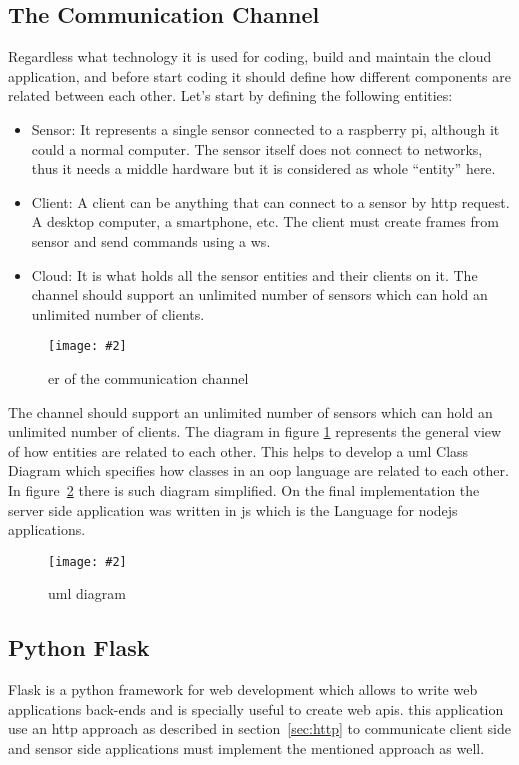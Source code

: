 \documentclass[hidelinks,11pt,a4paper,oneside,article]{memoir}
\newcommand{\putimage}[3][10] %
{
\begin{figure}[h]
	\centering
	\captionsetup{justification=centering}
	\texttt{[image: \#2]}
	\caption{#3}
	\label{fig:#2}
\end{figure}
}
\begin{document}
\subsection{The Communication Channel}\label{sec:the-communication-channel}
Regardless what technology it is used for coding, build and maintain the cloud application, and before start coding it should define how different components are related between each other.
Let’s start by defining the following entities:
\begin{itemize}
    \item Sensor: It represents a single sensor connected to a raspberry pi, although it could a normal computer. The sensor itself does not connect to networks, thus it needs a middle hardware but it is considered as whole “entity” here.
    \item Client: A client can be anything that can connect to a sensor by \gls{http} request. A desktop computer, a smartphone, etc. The client must create frames from sensor and send commands using a \gls{ws}.
    \item Cloud: It is what holds all the sensor entities and their clients on it.
    The channel should support an unlimited number of sensors which can hold an unlimited number of clients.
\end{itemize}
\putimage[15]{channel-er}{\acrlong{er} of the communication channel}
The channel should support an unlimited number of sensors which can hold an unlimited number of clients.
The diagram in figure \ref{fig:channel-er} represents the general view of how entities are related to each other. This helps to develop a \gls{uml} Class Diagram which specifies how classes in an \gls{oop} language are related to each other. In figure~\ref{fig:channel-uml} there is such diagram simplified.
On the final implementation the server side application was written in \gls{js} which is the Language for \gls{nodejs} applications.
\putimage[15]{channel-uml}{\gls{uml} diagram}



\subsection{Python Flask}
Flask is a \gls{python} framework for web development which allows to write web applications back-ends and is specially useful to create web \gls{api}s. this application use an \gls{http} approach as described in section~\ref{sec:http} to communicate client side and sensor side applications must implement the mentioned approach as well.
\end{document}
